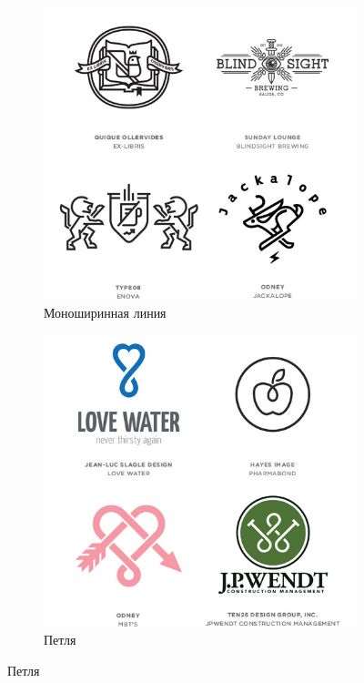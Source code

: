 \begin{figure}[h!]
  \vfill

  \centering
  \begin{subfigure}{.45\textwidth}
    \centering
    \includegraphics[width=\linewidth]{images/supplement/logolounge/2013/Monoshirinnaya-liniya}
    \caption{Моноширинная линия}
    \label{fig:logolounge:2013:monoshirinnaya-liniya}
  \end{subfigure}
  \hfill
  \centering
  \begin{subfigure}{.45\textwidth}
    \centering
    \includegraphics[width=\linewidth]{images/supplement/logolounge/2013/Petlya}
    \caption{Петля}
    \label{fig:logolounge:2013:petlya}
  \end{subfigure}
\end{figure}

